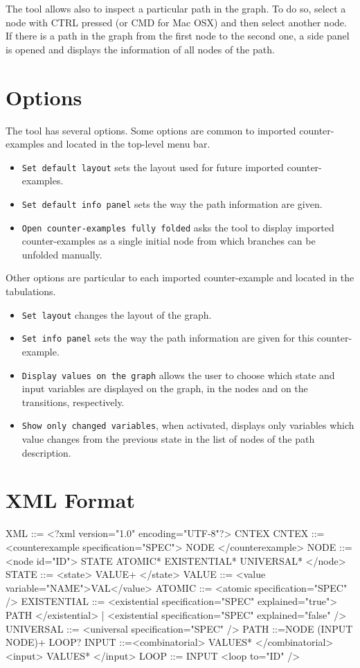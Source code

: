\documentclass{article}
\begin{document}
	The tool allows also to inspect a particular path in the graph. To do so, select a node with CTRL pressed (or CMD for Mac OSX) and then select another node. If there is a path in the graph from the first node to the second one, a side panel is opened and displays the information of all nodes of the path.
	
	\section*{Options}
	
	The tool has several options. Some options are common to imported counter-examples and located in the top-level menu bar.
	\begin{itemize}
		\item \texttt{Set default layout} sets the layout used for future imported counter-examples.
		\item \texttt{Set default info panel} sets the way the path information are given.
		\item \texttt{Open counter-examples fully folded} asks the tool to display imported counter-examples as a single initial node from which branches can be unfolded manually.
	\end{itemize}
	Other options are particular to each imported counter-example and located in the tabulations.
	\begin{itemize}
		\item \texttt{Set layout} changes the layout of the graph.
		\item \texttt{Set info panel} sets the way the path information are given for this counter-example.
		\item \texttt{Display values on the graph} allows the user to choose which state and input variables are displayed on the graph, in the nodes and on the transitions, respectively.
		\item \texttt{Show only changed variables}, when activated, displays only variables which value changes from the previous state in the list of nodes of the path description.
	\end{itemize}
	
	
	\newpage
	\section*{XML Format}
	
	\begin{verbatimtab}[4]
XML			::=	<?xml version="1.0" encoding="UTF-8"?>
					CNTEX
CNTEX		::=	<counterexample specification="SPEC">
					NODE
				</counterexample>
NODE		::=	<node id="ID">
					STATE
					ATOMIC*
					EXISTENTIAL*
					UNIVERSAL*
				</node>
STATE		::=	<state>
					VALUE+
				</state>
VALUE		::=	<value variable="NAME">VAL</value>
ATOMIC		::=	<atomic specification="SPEC" />
EXISTENTIAL	::=	<existential specification="SPEC" explained="true">
					PATH
				</existential>
				| <existential specification="SPEC" explained="false" />
UNIVERSAL	::=	<universal specification="SPEC" />
PATH		::=NODE (INPUT NODE)+ LOOP?
INPUT		::=<combinatorial>
					VALUES*
				</combinatorial>
				<input>
					VALUES*
				</input>
LOOP		::=	INPUT
				<loop to="ID" />
	\end{verbatimtab}
\end{document}
